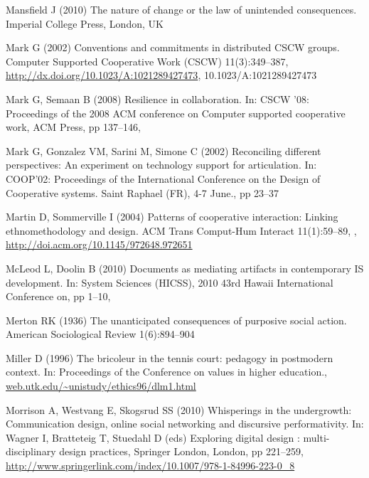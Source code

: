 \documentclass{article}
\begin{document}
\begin{thebibliography}{193}
Mansfield J (2010) The nature of change or the law of unintended consequences.
  Imperial College Press, London, {UK}

Mark G (2002) Conventions and commitments in distributed {CSCW} groups.
  Computer Supported Cooperative Work {(CSCW)} 11(3):349--387,
  \urlprefix\url{http://dx.doi.org/10.1023/A:1021289427473},
  {10.1023/A:1021289427473}

Mark G, Semaan B (2008) Resilience in collaboration. In: {CSCW} '08:
  Proceedings of the 2008 {ACM} conference on Computer supported cooperative
  work, {ACM} Press, pp 137--146, 

Mark G, Gonzalez VM, Sarini M, Simone C (2002) Reconciling different
  perspectives: An experiment on technology support for articulation. In:
  {COOP'02:} Proceedings of the International Conference on the Design of
  Cooperative systems. Saint Raphael {(FR)}, 4-7 June., pp 23--37

Martin D, Sommerville I (2004) Patterns of cooperative interaction: Linking
  ethnomethodology and design. {ACM} Trans Comput-Hum Interact 11(1):59--89,
  ,
  \urlprefix\url{http://doi.acm.org/10.1145/972648.972651}

{McLeod} L, Doolin B (2010) Documents as mediating artifacts in contemporary
  {IS} development. In: System Sciences {(HICSS)}, 2010 43rd Hawaii
  International Conference on, pp 1--10, 

Merton RK (1936) The unanticipated consequences of purposive social action.
  American Sociological Review 1(6):894--904

Miller D (1996) The bricoleur in the tennis court: pedagogy in postmodern
  context. In: Proceedings of the Conference on values in higher education.,
  \urlprefix\url{web.utk.edu/~unistudy/ethics96/dlm1.html}

Morrison A, Westvang E, Skogsrud SS (2010) Whisperings in the undergrowth:
  Communication design, online social networking and discursive performativity.
  In: Wagner I, Bratteteig T, Stuedahl D (eds) Exploring digital design :
  multi-disciplinary design practices, Springer London, London, pp 221--259,
  \urlprefix\url{http://www.springerlink.com/index/10.1007/978-1-84996-223-0_8}


\end{thebibliography}
\end{document}
